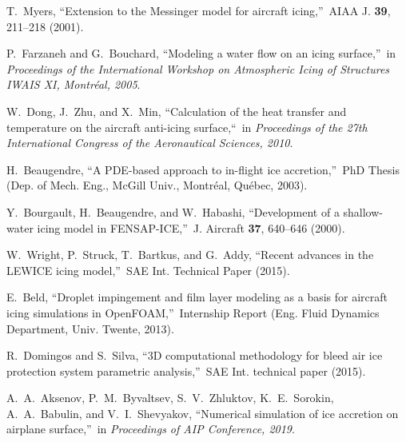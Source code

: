 \documentclass[
11pt,%
tightenlines,%
twoside,%
onecolumn,%
nofloats,%
nobibnotes,%
nofootinbib,%
superscriptaddress,%
noshowpacs,%
centertags]%
{revtex4}
\begin{document}
\begin{thebibliography}{99}


T.~Myers, \textquotedblleft Extension to the Messinger model for aircraft icing,\textquotedblright \ AIAA J. \textbf{39}, 211--218 (2001).

P.~Farzaneh and G.~Bouchard, \textquotedblleft Modeling a water flow on an icing surface,\textquotedblright \ in \textit{Proceedings of the International Workshop on Atmospheric Icing of Structures IWAIS XI, Montr\'eal, 2005}.

W.~Dong, J.~Zhu, and X.~Min, \textquotedblleft Calculation of the heat transfer and temperature on the aircraft anti-icing surface,\textquotedblleft \ in \textit{Proceedings of the 27th International Congress of the Aeronautical Sciences, 2010}.

H.~Beaugendre, \textquotedblleft A PDE-based approach to in-flight ice accretion,\textquotedblright \ PhD Thesis (Dep. of Mech. Eng., McGill Univ., Montr\'eal, Qu\'ebec, 2003).


Y.~Bourgault, H.~Beaugendre, and W.~Habashi, \textquotedblleft Development of a shallow-water icing model in FENSAP-ICE,\textquotedblright \ J. Aircraft \textbf{37}, 640--646 (2000).

W.~Wright, P.~Struck, T.~Bartkus, and G.~Addy, \textquotedblleft Recent advances in the LEWICE icing model,\textquotedblright \ SAE Int. Technical Paper (2015).

E.~Beld, \textquotedblleft Droplet impingement and film layer modeling as a basis for aircraft icing simulations in OpenFOAM,\textquotedblright \ Internship Report (Eng. Fluid Dynamics Department, Univ. Twente, 2013).

R.~Domingos and S.~Silva, \textquotedblleft 3D computational methodology for bleed air ice protection system parametric analysis,\textquotedblright \ SAE Int. technical paper (2015).

A.~A.~Aksenov, P.~M.~Byvaltsev, S.~V.~Zhluktov, K.~E.~Sorokin, A.~A.~Babulin, and V.~I.~Shevyakov, \textquotedblleft Numerical simulation of ice accretion on airplane surface,\textquotedblright \ in \textit{Proceedings of AIP Conference, 2019}.


\end{thebibliography}
\end{document}
